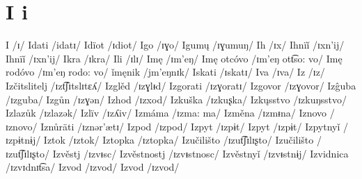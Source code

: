 \chapter{I i}

I /ɪ/ 
Idati /idatɪ/ 
Idïot /ɪdiot/ 
Igo /ɪɣo/ 
Igumų /ɪɣumuŋ/ 
Ih /ɪx/ 
Ihnïǐ /ɪxn’ij/ 
Ihnïǐ /ɪxn’ij/ 
Ikra /ɪkra/ 
Ili /ɪlɪ/ 
Imę /ɪm’eŋ/ 
Imę otcóvo /ɪm’eŋ ott͡so: vo/ 
Imę rodóvo /ɪm’eŋ rodo: vo/ 
ǐmęnik /jm’eŋnɪk/ 
Iskati /ɪskatɪ/ 
Iva /ɪva/ 
Iz /ɪz/ 
Izčitslitelj /ɪzt͡ʃɪtslɪtɛʎ/ 
Izglěd /ɪzɣlᵻd/ 
Izgorati /ɪzɣoratɪ/ 
Izgovor /ɪzɣovor/ 
Izĝuba /ɪzguba/ 
Izgůn /ɪzɣən/ 
Izhod /ɪzxod/ 
Izkuška /ɪzkuʂka/ 
Izkųsstvo /ɪzkuŋsstvo/ 
Izlazůk /ɪzlazək/ 
Izlïv /ɪzʎiv/ 
Izmáma /ɪzma: ma/ 
Izměna /ɪzmᵻna/ 
Iznovo /ɪznovo/ 
Iznůräti /ɪznər’ætɪ/ 
Izpod /ɪzpod/ 
Izpyt /ɪzpɨt/ 
Izpyt /ɪzpɨt/ 
Izpytnyǐ /ɪzpɨtnɨj/ 
Iztok /ɪztok/ 
Iztopka /ɪztopka/ 
Izučilišto /ɪzut͡ʃɪlɪʂto/ 
Izučilišto /ɪzut͡ʃɪlɪʂto/ 
Izvěstj /ɪzvᵻsc/ 
Izvěstnostj /ɪzvᵻstnosc/ 
Izvěstnyǐ /ɪzvᵻstnɨj/ 
Izvidnica /ɪzvɪdnɪt͡sa/ 
Izvod /ɪzvod/ 
Izvod /ɪzvod/